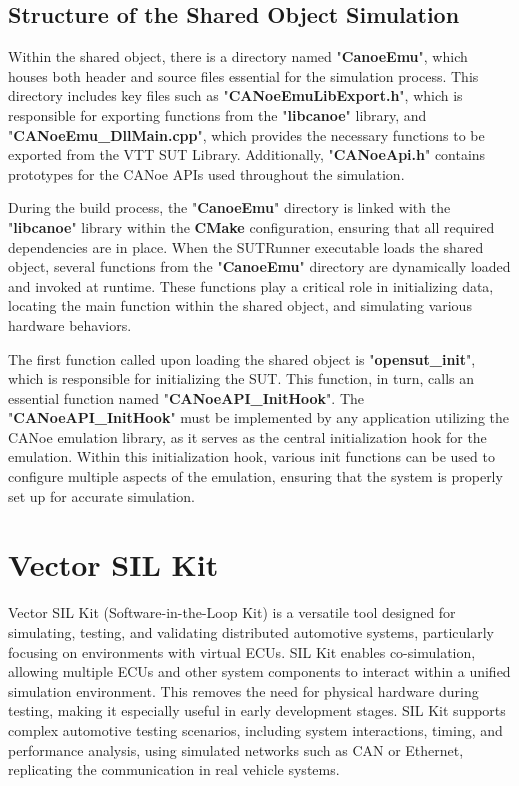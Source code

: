 \subsection{Structure of the Shared Object Simulation}\label{subsec:structure_of_simulation}
Within the shared object, there is a directory named "\textbf{CanoeEmu}", which houses both header and source files essential for the simulation process. This directory includes key files such as "\textbf{CANoeEmuLibExport.h}", which is responsible for exporting functions from the "\textbf{libcanoe}" library, and "\textbf{CANoeEmu\_DllMain.cpp}", which provides the necessary functions to be exported from the VTT SUT Library. Additionally, "\textbf{CANoeApi.h}" contains prototypes for the CANoe APIs used throughout the simulation.

During the build process, the "\textbf{CanoeEmu}" directory is linked with the "\textbf{libcanoe}" library within the \textbf{CMake} configuration, ensuring that all required dependencies are in place. When the SUTRunner executable loads the shared object, several functions from the "\textbf{CanoeEmu}" directory are dynamically loaded and invoked at runtime. These functions play a critical role in initializing data, locating the main function within the shared object, and simulating various hardware behaviors.

The first function called upon loading the shared object is "\textbf{opensut\_init}", which is responsible for initializing the SUT. This function, in turn, calls an essential function named "\textbf{CANoeAPI\_InitHook}". The "\textbf{CANoeAPI\_InitHook}" must be implemented by any application utilizing the CANoe emulation library, as it serves as the central initialization hook for the emulation. Within this initialization hook, various init functions can be used to configure multiple aspects of the emulation, ensuring that the system is properly set up for accurate simulation.

\section{Vector SIL Kit}
Vector SIL Kit (Software-in-the-Loop Kit) is a versatile tool designed for simulating, testing, and validating distributed automotive systems, particularly focusing on environments with virtual ECUs. SIL Kit enables co-simulation, allowing multiple ECUs and other system components to interact within a unified simulation environment. This removes the need for physical hardware during testing, making it especially useful in early development stages. SIL Kit supports complex automotive testing scenarios, including system interactions, timing, and performance analysis, using simulated networks such as CAN or Ethernet, replicating the communication in real vehicle systems. \cite{sil_kit_github}

